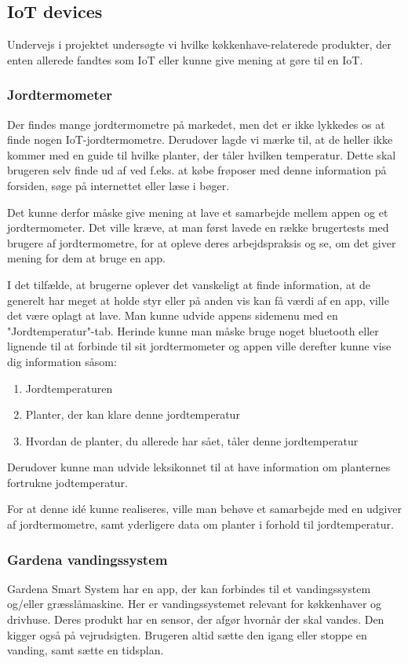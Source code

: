 \subsection{IoT devices}
Undervejs i projektet undersøgte vi hvilke køkkenhave-relaterede produkter, der enten allerede fandtes som IoT eller kunne give mening at gøre til en IoT.

\subsubsection{Jordtermometer}
Der findes mange jordtermometre på markedet, men det er ikke lykkedes os at finde nogen IoT-jordtermometre. Derudover lagde vi mærke til, at de heller ikke kommer med en guide til hvilke planter, der tåler hvilken temperatur. Dette skal brugeren selv finde ud af ved f.eks. at købe frøposer med denne information på forsiden, søge på internettet eller læse i bøger. 

Det kunne derfor måske give mening at lave et samarbejde mellem appen og et jordtermometer. Det ville kræve, at man først lavede en række brugertests med brugere af jordtermometre, for at opleve deres arbejdspraksis og se, om det giver mening for dem at bruge en app.

I det tilfælde, at brugerne oplever det vanskeligt at finde information, at de generelt har meget at holde styr eller på anden vis kan få værdi af en app, ville det være oplagt at lave. Man kunne udvide appens sidemenu med en "Jordtemperatur"-tab. Herinde kunne man måske bruge noget bluetooth eller lignende til at forbinde til sit jordtermometer og appen ville derefter kunne vise dig information såsom:

\begin{enumerate}
    \item{Jordtemperaturen}
    \item{Planter, der kan klare denne jordtemperatur}
    \item{Hvordan de planter, du allerede har sået, tåler denne jordtemperatur}
\end{enumerate}

Derudover kunne man udvide leksikonnet til at have information om planternes fortrukne jodtemperatur.

For at denne idé kunne realiseres, ville man behøve et samarbejde med en udgiver af jordtermometre, samt yderligere data om planter i forhold til jordtemperatur.

\subsubsection{Gardena vandingssystem}
Gardena Smart System har en app, der kan forbindes til et vandingssystem og/eller græsslåmaskine. Her er vandingssystemet relevant for køkkenhaver og drivhuse. Deres produkt har en sensor, der afgør hvornår der skal vandes. Den kigger også på vejrudsigten. Brugeren altid sætte den igang eller stoppe en vanding, samt sætte en tidsplan.

